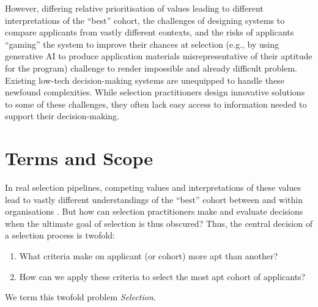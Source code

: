 However, differing relative prioritisation of values leading to different interpretations of the ``best'' cohort, the challenges of designing systems to compare applicants from vastly different contexts, and the risks of applicants ``gaming'' the system to improve their chances at selection (e.g., by using generative AI to produce application materials misrepresentative of their aptitude for the program) challenge to render impossible and already difficult problem. Existing low-tech decision-making systems are unequipped to handle these newfound complexities. While selection practitioners design innovative solutions to some of these challenges, they often lack easy access to information needed to support their decision-making.

\section{Terms and Scope}

In real selection pipelines, competing values and interpretations of these values lead to vastly different understandings of the ``best'' cohort between and within organisations \cite{zimmerman_research_2014}. But how can selection practitioners make and evaluate decisions when the ultimate goal of selection is thus obscured? Thus, the central decision of a selection process is twofold: 

\begin{enumerate}
    \item What criteria make on applicant (or cohort) more apt than another?
    \item How can we apply these criteria to select the most apt cohort of applicants?
\end{enumerate}

We term this twofold problem \emph{Selection}.

